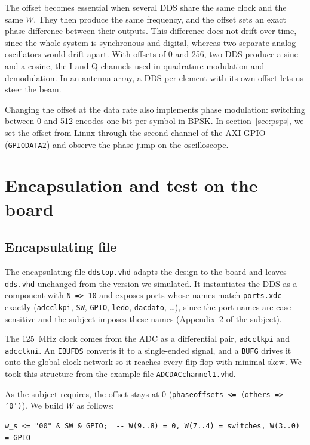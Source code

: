 \documentclass[11pt,a4paper]{article}
\renewcommand{\_}{\oldunderscore\allowbreak}
\begin{document}
The offset becomes essential when several DDS share the same clock and the same
$W$. They then produce the same frequency, and the offset sets an exact phase
difference between their outputs. This difference does not drift over time, since
the whole system is synchronous and digital, whereas two separate analog
oscillators would drift apart. With offsets of 0 and 256, two DDS produce a sine and
a cosine, the I and Q channels used in quadrature modulation and demodulation. In an
antenna array, a DDS per element with its own offset lets us steer the beam.

Changing the offset at the data rate also implements phase modulation: switching
between 0 and 512 encodes one bit per symbol in BPSK. In
section~\ref{sec:psps}, we set the offset from Linux through the second channel of
the AXI GPIO (\texttt{GPIO\_DATA2}) and observe the phase jump on the oscilloscope.

\section{Encapsulation and test on the board}

\subsection{Encapsulating file}
The encapsulating file \texttt{dds\_top.vhd} adapts the design to the board and
leaves \texttt{dds.vhd} unchanged from the version we simulated. It instantiates the
DDS as a component with \texttt{N => 10} and exposes ports whose names match
\texttt{ports.xdc} exactly (\texttt{adc\_clk\_p\_i}, \texttt{SW}, \texttt{GPIO},
\texttt{led\_o}, \texttt{dac\_dat\_o}, \dots), since the port names are
case-sensitive and the subject imposes these names (Appendix~2 of the subject).

The \SI{125}{\mega\hertz} clock comes from the ADC as a differential pair,
\texttt{adc\_clk\_p\_i} and \texttt{adc\_clk\_n\_i}. An \texttt{IBUFDS} converts it
to a single-ended signal, and a \texttt{BUFG} drives it onto the global clock
network so it reaches every flip-flop with minimal skew. We took this structure from
the example file \texttt{ADC\_DAC\_channel1.vhd}.

As the subject requires, the offset stays at 0
(\texttt{phase\_offset\_s <= (others => '0')}). We build $W$ as follows:

\begin{lstlisting}[style=vhdl, caption={Construction of $W$ in the encapsulating file}]
w_s <= "00" & SW & GPIO;  -- W(9..8) = 0, W(7..4) = switches, W(3..0) = GPIO
\end{lstlisting}
\end{document}
